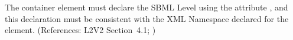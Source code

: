 The  container element must declare the SBML Level
using the attribute , and this declaration must be
consistent with the XML Namespace declared for the 
element.  (References: L2V2 Section~4.1; )
